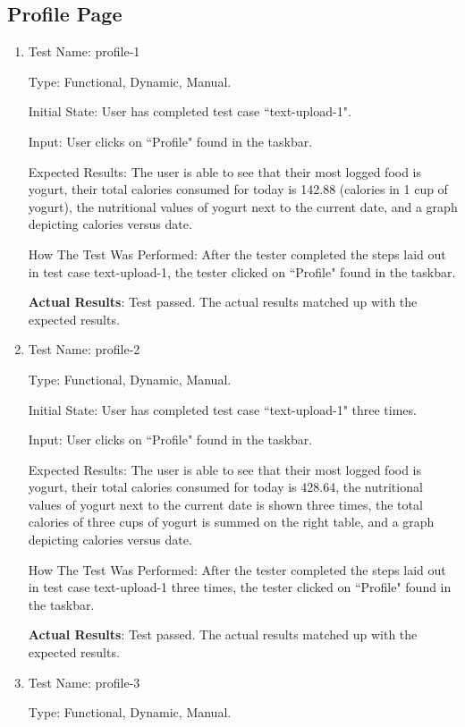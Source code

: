 \documentclass[12pt, titlepage]{article}
\begin{document}
	\subsection{Profile Page}
	\begin{enumerate}
		\item{Test Name: profile-1}
		
		Type: Functional, Dynamic, Manual.
		
		Initial State: User has completed test case ``text-upload-1".
		
		Input: User clicks on ``Profile" found in the taskbar.
		
		Expected Results: The user is able to see that their most logged food is yogurt, their total calories consumed for today is 142.88 (calories in 1 cup of yogurt), the nutritional values of yogurt next to the current date, and a graph depicting calories versus date.
		
		How The Test Was Performed: After the tester completed the steps laid out in test case text-upload-1, the tester clicked on ``Profile" found in the taskbar.
		
		\textbf{Actual Results}: Test passed. The actual results matched up with the expected results.
		
		\item{Test Name: profile-2}
		
		Type: Functional, Dynamic, Manual.
		
		Initial State: User has completed test case ``text-upload-1" three times.
		
		Input: User clicks on ``Profile" found in the taskbar.
		
		Expected Results: The user is able to see that their most logged food is yogurt, their total calories consumed for today is 428.64, the nutritional values of yogurt next to the current date is shown three times, the total calories of three cups of yogurt is summed on the right table, and a graph depicting calories versus date.
		
		How The Test Was Performed: After the tester completed the steps laid out in test case text-upload-1 three times, the tester clicked on ``Profile" found in the taskbar.
		
		\textbf{Actual Results}: Test passed. The actual results matched up with the expected results.
		
		\item{Test Name: profile-3}
		
		Type: Functional, Dynamic, Manual.
		

\end{enumerate}
\end{document}
